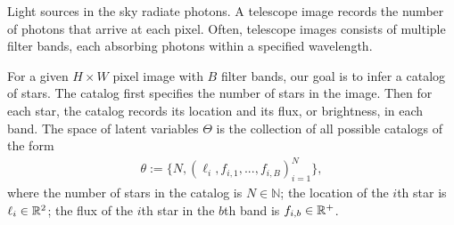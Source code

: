 Light sources in the sky radiate photons. A telescope image records the number of photons that arrive at each pixel. Often, telescope images consists of multiple filter bands, each absorbing photons within a specified wavelength. 

For a given $H \times W$ pixel image with $B$ filter bands, our goal is to infer a catalog of 
stars. 
The catalog first specifies the number of stars 
in the image. Then for each star, the catalog 
records its location and its flux, or brightness,
in each band. 
The space of latent variables 
$\Theta$ is the collection of all possible catalogs of the form
\begin{align}
    \theta := \{N, (\ell_i, f_{i,1}, ..., f_{i,B})_{i = 1}^N\},
    \label{eq:cat_formulation}
\end{align}
where the number of stars in the catalog
is $N\in\mathbb{N}$;
the location of the $i$th star is $\ell_i \in \mathbb{R}^2$;
the flux of the $i$th star in the $b$th band is $f_{i, b}\in\mathbb{R}^+$. 

